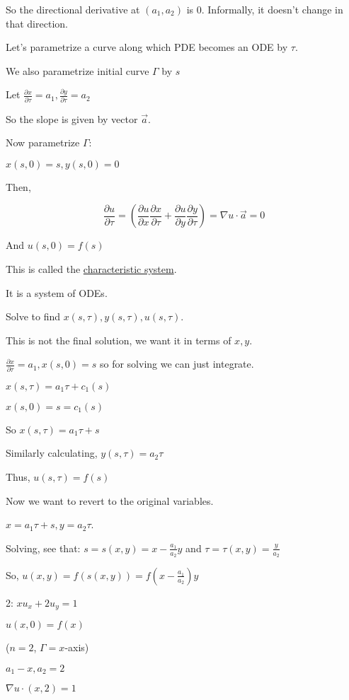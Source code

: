 \documentclass{article}
\theoremstyle{definition}
\begin{document}
So the directional derivative at \((a_1, a_2)\) is \(0\). Informally, it doesn't change in that direction.

Let's parametrize a curve along which PDE becomes an ODE by \(\tau\).

We also parametrize initial curve \(\Gamma\) by \(s\)

Let \(\frac{\partial x}{\partial \tau} = a_1, \frac{\partial y}{\partial \tau} = a_2 \)

So the slope is given by vector \(\vec{a}\).

Now parametrize \(\Gamma\): 

\(x(s,0)=s,y(s,0)=0\) 

Then,

\[
    \frac{\partial u}{\partial \tau} = \left( \frac{\partial u}{\partial x} \frac{\partial x}{\partial \tau} + \frac{\partial u}{\partial y} \frac{\partial y}{\partial \tau} \right) = \nabla u \cdot \vec{a} = 0 
\]

And \(u(s,0)=f(s)\) 

This is called the \underline{characteristic system}.

It is a system of ODEs.

Solve to find \(x(s,\tau),y(s,\tau),u(s,\tau)\).

This is not the final solution, we want it in terms of \(x,y\).

\(\frac{\partial x}{\partial \tau} = a_1, x(s,0)=s\) so for solving we can just integrate.

\(x(s,\tau) = a_1\tau + c_1(s)\) 

\(x(s,0)=s=c_1(s)\) 

So \(x(s,\tau)=a_1\tau + s\) 

Similarly calculating, \(y(s,\tau)=a_2\tau\) 

Thus, \(u(s,\tau)=f(s)\)

Now we want to revert to the original variables.

\(x = a_1\tau + s, y=a_2\tau\).

Solving, see that: \(s = s(x,y) = x - \frac{a_1}{a_2}y\) and \(\tau = \tau(x,y) = \frac{y}{a_2}\)

So, \(u(x,y)=f(s(x,y))=f(x-\frac{a_1}{a_2})y\) 

2: \(x u_x + 2 u_y = 1\) 

\(u(x,0)=f(x)\) 

(\(n = 2\), \(\Gamma = x\)-axis)

\(a_1 - x, a_2 = 2\)

\(\nabla u \cdot (x,2) = 1\) 
\end{document}
